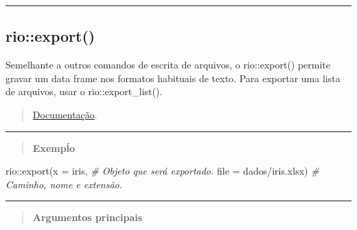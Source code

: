 \documentclass[
]{book}
\newenvironment{Shaded}{\begin{snugshade}}{\end{snugshade}}
\newcommand{\AttributeTok}[1]{\textcolor[rgb]{0.77,0.63,0.00}{#1}}
\newcommand{\CommentTok}[1]{\textcolor[rgb]{0.56,0.35,0.01}{\textit{#1}}}
\newcommand{\FunctionTok}[1]{\textcolor[rgb]{0.00,0.00,0.00}{#1}}
\newcommand{\NormalTok}[1]{#1}
\newcommand{\SpecialCharTok}[1]{\textcolor[rgb]{0.00,0.00,0.00}{#1}}
\newcommand{\StringTok}[1]{\textcolor[rgb]{0.31,0.60,0.02}{#1}}
\theoremstyle{definition}
\theoremstyle{definition}
\theoremstyle{definition}
\theoremstyle{definition}
\theoremstyle{remark}
\begin{document}
\begin{center}\rule{0.5\linewidth}{0.5pt}\end{center}

\hypertarget{rioexport}{%
\subsection{rio::export()}\label{rioexport}}

Semelhante a outros comandos de escrita de arquivos, o rio::export() permite gravar um data frame nos formatos habituais de texto. Para exportar uma lista de arquivos, usar o rio::export\_list().

\begin{quote}
\href{https://www.rdocumentation.org/packages/rio/versions/0.5.29/topics/export}{Documentação}.
\end{quote}

\begin{center}\rule{0.5\linewidth}{0.5pt}\end{center}

\begin{quote}
\textbf{Exempĺo}
\end{quote}

\begin{Shaded}
\begin{Highlighting}[]
\NormalTok{rio}\SpecialCharTok{::}\FunctionTok{export}\NormalTok{(}\AttributeTok{x =}\NormalTok{ iris,                  }\CommentTok{\# Objeto que será exportado.}
            \AttributeTok{file =} \StringTok{\textquotesingle{}dados/iris.xlsx\textquotesingle{}}\NormalTok{)  }\CommentTok{\# Caminho, nome e extensão.}
\end{Highlighting}
\end{Shaded}

\begin{center}\rule{0.5\linewidth}{0.5pt}\end{center}

\begin{quote}
\textbf{Argumentos principais}
\end{quote}
\end{document}
